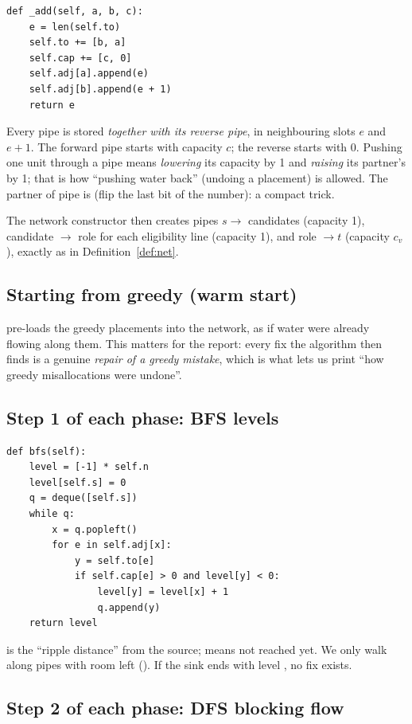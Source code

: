 \documentclass[11pt]{article}
\begin{document}
\begin{lstlisting}
def _add(self, a, b, c):
    e = len(self.to)
    self.to += [b, a]
    self.cap += [c, 0]
    self.adj[a].append(e)
    self.adj[b].append(e + 1)
    return e
\end{lstlisting}
Every pipe is stored \emph{together with its reverse pipe}, in neighbouring slots $e$ and $e{+}1$. The forward pipe starts with capacity $c$; the reverse starts with $0$. Pushing one unit through a pipe means \emph{lowering} its capacity by 1 and \emph{raising} its partner's by 1; that is how ``pushing water back'' (undoing a placement) is allowed. The partner of pipe  is  (flip the last bit of the number): a compact trick.

The network constructor then creates pipes $s\to$ candidates (capacity 1), candidate $\to$ role for each eligibility line (capacity 1), and role $\to t$ (capacity $c_v$), exactly as in Definition~\ref{def:net}.

\subsection{Starting from greedy (warm start)}

 pre-loads the greedy placements into the network, as if water were already flowing along them. This matters for the report: every fix the algorithm then finds is a genuine \emph{repair of a greedy mistake}, which is what lets us print ``how greedy misallocations were undone''.

\subsection{Step 1 of each phase: BFS levels}

\begin{lstlisting}
def bfs(self):
    level = [-1] * self.n
    level[self.s] = 0
    q = deque([self.s])
    while q:
        x = q.popleft()
        for e in self.adj[x]:
            y = self.to[e]
            if self.cap[e] > 0 and level[y] < 0:
                level[y] = level[x] + 1
                q.append(y)
    return level
\end{lstlisting}
 is the ``ripple distance'' from the source;  means not reached yet. We only walk along pipes with room left (). If the sink ends with level , no fix exists.

\subsection{Step 2 of each phase: DFS blocking flow}
\end{document}
